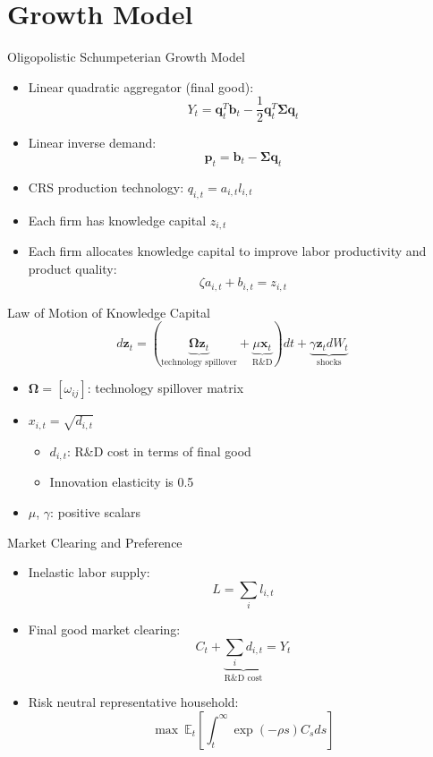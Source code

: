\documentclass[english,aspectratio=169,handout]{beamer}
\theoremstyle{plain}
\newcommand{\mat}[1]{\bm{#1}}
\begin{document}
\section{Growth Model}
\begin{frame}{Oligopolistic Schumpeterian Growth Model}

  \begin{itemize}
    \item Linear quadratic aggregator (final good):
          \[
            Y_{t}=\mathbf{q}_{t}^{T}\mathbf{b}_{t}-\frac{1}{2}\mathbf{q}_{t}^{T}\mat{\Sigma}\mathbf{q}_{t}
          \]
    \item Linear inverse demand:
          \[
            \mathbf{p}_{t}=\mathbf{b}_{t}-\mat{\Sigma}\mathbf{q}_{t}
          \]
    \item CRS production technology: $q_{i,t}=a_{i,t}l_{i,t}$\medskip{}
    \item Each firm has knowledge capital $z_{i,t}$\medskip{}
    \item Each firm allocates knowledge capital to improve labor productivity
          and product quality:
          \[
            \zeta a_{i,t}+b_{i,t}=z_{i,t}
          \]
  \end{itemize}
\end{frame}
%
\begin{frame}{Law of Motion of Knowledge Capital}
  \[
    d\mathbf{z}_{t}=\left(\underbrace{\mat{\Omega}\mathbf{z}_{t}}_{\text{technology spillover}}+\underbrace{\mu\mathbf{x}_{t}}_{\text{R\&D}}\right)dt+\underbrace{\gamma\mathbf{z}_{t}dW_{t}}_{\text{shocks}}
  \]
  \begin{itemize}
    \item $\mat{\Omega}=\left[\omega_{ij}\right]$: technology spillover matrix\medskip{}
    \item $x_{i,t}=\sqrt{d_{i,t}}$
          \begin{itemize}
            \item $d_{i,t}$: R\&D cost in terms of final good
            \item Innovation elasticity is 0.5\medskip{}
          \end{itemize}
    \item $\mu$, $\gamma$: positive scalars
  \end{itemize}
\end{frame}
%
\begin{frame}{Market Clearing and Preference}
  \begin{itemize}
    \item Inelastic labor supply:
          \[
            L=\sum_{i}l_{i,t}
          \]
    \item Final good market clearing:
          \[
            C_{t}+\underbrace{\sum_{i}d_{i,t}}_{\text{R\&D cost}}=Y_{t}
          \]
    \item Risk neutral representative household:
          \[
            \max\ \mathbb{E}_{t}\left[\int_{t}^{\infty}\exp\left(-\rho s\right)C_{s}ds\right]
          \]
  \end{itemize}
\end{frame}
%
\end{document}
